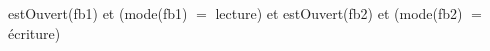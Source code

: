 \begin{algorithme}
    {estOuvert(fb1) et (mode(fb1) $=$ lecture) et estOuvert(fb2) et (mode(fb2) $=$ écriture)}
\end{algorithme}